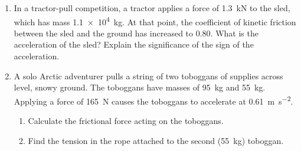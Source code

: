 \begin{enumerate}[itemsep=6pt]
\item In a tractor-pull competition, a tractor applies a force of
  \SI{1.3}{\kilo\newton} to the sled, which has mass \SI{1.1e4}{\kilo\gram}. At
  that point, the coefficient of kinetic friction between the sled and the
  ground has increased to 0.80. What is the acceleration of the sled? Explain
  the significance of the sign of the acceleration. 
 
\item A solo Arctic adventurer pulls a string of two toboggans of supplies
  across level, snowy ground. The toboggans have masses of \SI{95}{\kilo\gram}
  and \SI{55}{\kilo\gram}. Applying a force of \SI{165}{\newton} causes the
  toboggans to accelerate at \SI{.61}{\metre\per\second\squared}.
  \begin{enumerate}[itemsep=3pt]
  \item Calculate the frictional force acting on the toboggans. 
  \item Find the tension in the rope attached to the second
    (\SI{55}{\kilo\gram}) toboggan.
  \end{enumerate}


\end{enumerate}
